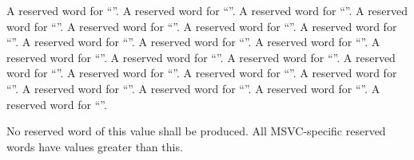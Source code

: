  A reserved word for ``''.
 A reserved word for ``''.
 A reserved word for ``''.
 A reserved word for ``''.
 A reserved word for ``''.
 A reserved word for ``''.
 A reserved word for ``''.
 A reserved word for ``''.
 A reserved word for ``''.
 A reserved word for ``''.
 A reserved word for ``''.
 A reserved word for ``''.
 A reserved word for ``''.
 A reserved word for ``''.
 A reserved word for ``''.
 A reserved word for ``''.
 A reserved word for ``''.
 A reserved word for ``''.
 A reserved word for ``''.
 A reserved word for ``''.
 A reserved word for ``''.


  No reserved word of this value shall be produced.  All MSVC-specific
reserved words have values greater than this.


